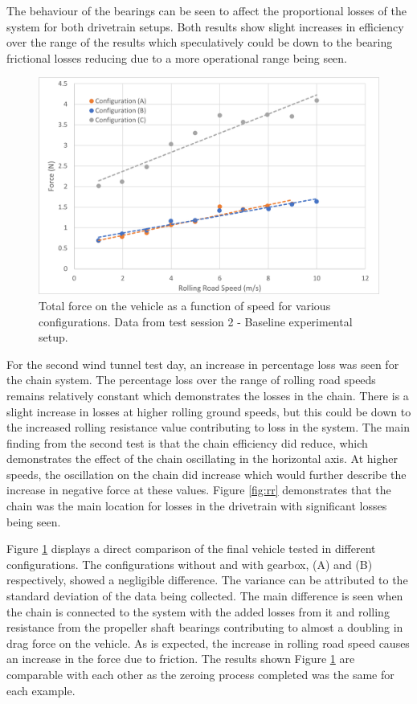 The behaviour of the bearings can be seen to affect the proportional losses of the system for both drivetrain setups. Both results show slight increases in efficiency over the range of the results which speculatively could be down to the bearing frictional losses reducing due to a more operational range being seen.

\begin{figure}[!htbp]
    \centering
    \includegraphics{images/part11/rollingresistancecomparisons.png}
    \caption{Total force on the vehicle as a function of speed for various configurations. Data from test session 2 - Baseline experimental setup.}
    \label{fig:rrsynthesis}
\end{figure}

For the second wind tunnel test day, an increase in percentage loss was seen for the chain system. The percentage loss over the range of rolling road speeds remains relatively constant which demonstrates the losses in the chain. There is a slight increase in losses at higher rolling ground speeds, but this could be down to the increased rolling resistance value contributing to loss in the system. The main finding from the second test is that the chain efficiency did reduce, which demonstrates the effect of the chain oscillating in the horizontal axis. At higher speeds, the oscillation on the chain did increase which would further describe the increase in negative force at these values. Figure \ref{fig:rr} demonstrates that the chain was the main location for losses in the drivetrain with significant losses being seen.

Figure \ref{fig:rrsynthesis} displays a direct comparison of the final vehicle tested in different configurations. The configurations without and with gearbox, (A) and (B) respectively, showed a negligible difference. The variance can be attributed to the standard deviation of the data being collected. The main difference is seen when the chain is connected to the system with the added losses from it and rolling resistance from the propeller shaft bearings contributing to almost a doubling in drag force on the vehicle. As is expected, the increase in rolling road speed causes an increase in the force due to friction. The results shown Figure \ref{fig:rrsynthesis} are comparable with each other as the zeroing process completed was the same for each example.


